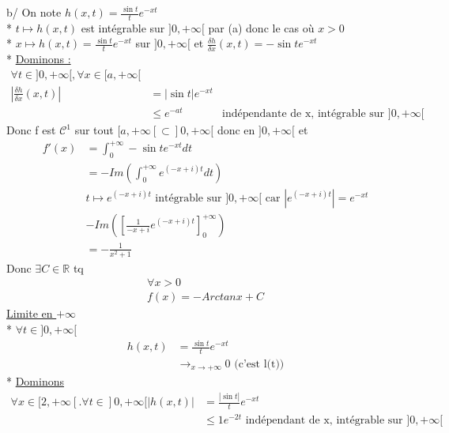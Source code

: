 \documentclass{article}
\begin{document}
\noindent b/ On note \(h(x,t) = \frac{\sin t}{t}e^{-xt}\)\\
* \(t \mapsto h(x,t)\) est intégrable sur \(]0, +\infty[\) par (a)
donc le cas où \(x > 0\)\\
* \(x \mapsto h(x,t) = \frac{\sin t}{t}e^{-xt}\) sur \(]0, +\infty[\)
et \(\frac{\delta h}{\delta x}(x,t) = -\sin t e^{-xt}\)\\
* \underline{Dominons :}\\
\begin{align*}
  \forall t \in ]0, +\infty[, \forall x \in [a, +\infty[\\
  |\frac{\delta h}{\delta x}(x,t)| &= |\sin t| e^{-xt}\\ 
                                   &\leq e^{-at}
                                   &\text{indépendante de x, intégrable sur \(]0, +\infty[\)}
\end{align*}
Donc f est \(\mathcal{C}^{1}\) sur tout \([a, +\infty[ \subset ]0, +\infty[\) donc en
\(]0, +\infty[\) et 
\begin{align*}
  f'(x) &= \int_{0}^{+\infty}-\sin t e^{-xt}dt\\ 
        &= -Im(\int_{0}^{+\infty}e^{(-x+i)t}dt)\\
        &\text{\(t \mapsto e^{(-x+i)t}\) intégrable sur \(]0, +\infty[\) car \(|e^{(-x+i)t}| = e^{-xt}\)}\\ 
        &-Im([\frac{1}{-x+i}e^{(-x+i)t}]_{0}^{+\infty})\\
        &= -\frac{1}{x^{2}+1}
\end{align*}
Donc \(\exists C \in \mathbb{R}\) tq \\
\begin{align*}
    \forall x > 0 \\ 
    f(x) = -Arctanx + C
\end{align*}
\underline{Limite en \(+\infty\)}\\
* \(\forall t \in ]0, +\infty[\)
\begin{align*}
  h(x,t) &= \frac{\sin t}{t}e^{-xt}\\
         &\to_{x \rightarrow +\infty} 0 \text{ (c'est l(t))}
\end{align*}
* \underline{Dominons}\\
\begin{align*}
  \forall x \in [2, +\infty[. \forall t \in ]0, +\infty[
  |h(x,t)| &= \frac{|\sin t|}{t}e^{-xt} \\
           &\leq 1 e^{-2t} \text{ indépendant de x, intégrable sur \(]0, +\infty[\)}
\end{align*}
\end{document}
